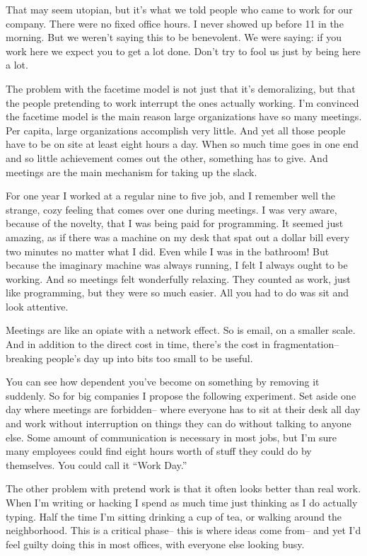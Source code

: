 \documentclass[12pt]{book}
\begin{document}
That may seem utopian, but it's what we told people who came to work for
our company. There were no fixed office hours. I never showed up before
11 in the morning. But we weren't saying this to be benevolent. We were
saying: if you work here we expect you to get a lot done. Don't try to
fool us just by being here a lot.

The problem with the facetime model is not just that it's demoralizing,
but that the people pretending to work interrupt the ones actually
working. I'm convinced the facetime model is the main reason large
organizations have so many meetings. Per capita, large organizations
accomplish very little. And yet all those people have to be on site at
least eight hours a day. When so much time goes in one end and so little
achievement comes out the other, something has to give. And meetings are
the main mechanism for taking up the slack.

For one year I worked at a regular nine to five job, and I remember well
the strange, cozy feeling that comes over one during meetings. I was
very aware, because of the novelty, that I was being paid for
programming. It seemed just amazing, as if there was a machine on my
desk that spat out a dollar bill every two minutes no matter what I did.
Even while I was in the bathroom! But because the imaginary machine was
always running, I felt I always ought to be working. And so meetings
felt wonderfully relaxing. They counted as work, just like programming,
but they were so much easier. All you had to do was sit and look
attentive.

Meetings are like an opiate with a network effect. So is email, on a
smaller scale. And in addition to the direct cost in time, there's the
cost in fragmentation-- breaking people's day up into bits too small to
be useful.

You can see how dependent you've become on something by removing it
suddenly. So for big companies I propose the following experiment. Set
aside one day where meetings are forbidden-- where everyone has to sit
at their desk all day and work without interruption on things they can
do without talking to anyone else. Some amount of communication is
necessary in most jobs, but I'm sure many employees could find eight
hours worth of stuff they could do by themselves. You could call it
``Work Day.''

The other problem with pretend work is that it often looks better than
real work. When I'm writing or hacking I spend as much time just
thinking as I do actually typing. Half the time I'm sitting drinking a
cup of tea, or walking around the neighborhood. This is a critical
phase-- this is where ideas come from-- and yet I'd feel guilty doing
this in most offices, with everyone else looking busy.
\end{document}
